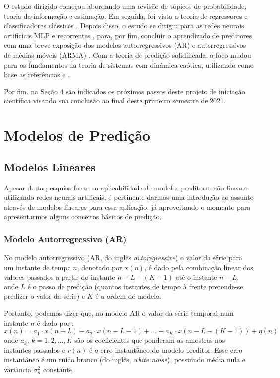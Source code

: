\documentclass[a4paper, 12pt]{article}
\begin{document}
O estudo dirigido começou abordando uma revisão de tópicos de probabilidade, teoria da informação e estimação. Em seguida, foi vista a teoria de regressores e classificadores clássicos \cite{hastie2009elements}. Depois disso, o estudo se dirigiu para as redes neurais artificiais MLP e recorrentes \cite{geron2019hands}, para, por fim, concluir o aprendizado de preditores com uma breve exposição dos modelos autorregressivos (AR) e autorregressivos de médias móveis (ARMA) \cite{box2015time}. Com a teoria de predição solidificada, o foco mudou para os fundamentos da teoria de sistemas com dinâmica caótica, utilizando como base as referências \cite{fiedler1994caos} e \cite{attux2001dinamica}.

Por fim, na Seção 4 são indicados os próximos passos deste projeto de iniciação científica visando sua conclusão ao final deste primeiro semestre de 2021. 

\section{Modelos de Predição}

\subsection{Modelos Lineares}

Apesar desta pesquisa focar na aplicabilidade de modelos preditores não-lineares utilizando redes neurais artificais, é pertinente darmos uma introdução ao assunto através de modelos lineares para essa aplicação, já aproveitando o momento para apresentarmos alguns conceitos básicos de predição.

\subsubsection{Modelo Autorregressivo (AR)}

No modelo autorregressivo (AR, do inglês \textit{autoregressive}) o valor da série para um instante de tempo $n$, denotado por $x(n)$, é dado pela combinação linear dos valores passados a partir do instante $n - L - (K - 1)$ até o instante $n - L$, onde $L$ é o passo de predição (quantos instantes de tempo à frente pretende-se predizer o valor da série) e $K$ é a ordem do modelo. 

Portanto, podemos dizer que, no modelo AR o valor da série temporal num instante $n$ é dado por \cite{haykin2008adaptive}:
\begin{equation}
x(n) = a_{1} \cdot x(n - L) + a_{2} \cdot x(n - L - 1) + ... + a_{K} \cdot x(n - L - (K - 1)) + \eta (n)
\end{equation}
onde $a_{k}$, $k = 1, 2, ..., K$ são os coeficientes que ponderam as amostras nos instantes passados e $\eta (n)$ é o erro instantâneo do modelo preditor. Esse erro instantâneo é um ruído branco (do inglês, \textit{white noise}), possuindo média nula e variância $\sigma_{n}^2$ constante \cite{box2015time}.
\end{document}
